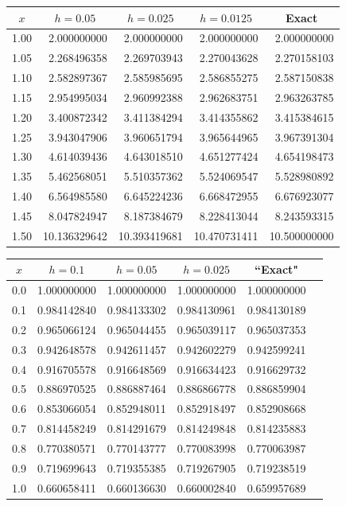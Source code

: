 \documentclass[dvips]{book}
\renewcommand{\exer}[1]{\par\medskip\;\noindent{\color{red}\bf #1.}}
\numberwithin{example}{section}
\numberwithin{equation}{section}
\numberwithin{theorem}{section}
\numberwithin{table}{section}
\numberwithin{figure}{section}
\begin{document}
\exer{3.2.26}
{\small
\begin{tabular}{|c|r|r|r|r|}\hline
\multicolumn{1}{|c|}{$x$}&
\multicolumn{1}{|c|}{$h=0.05$}&
\multicolumn{1}{|c|}{$h=0.025$}&
\multicolumn{1}{|c|}{$h=0.0125$}&
\multicolumn{1}{|c|}{Exact}\\ \hline
1.00 &  2.000000000 &  2.000000000 &  2.000000000 &  2.000000000 \\
1.05 &  2.268496358 &  2.269703943 &  2.270043628 &  2.270158103 \\
1.10 &  2.582897367 &  2.585985695 &  2.586855275 &  2.587150838 \\
1.15 &  2.954995034 &  2.960992388 &  2.962683751 &  2.963263785 \\
1.20 &  3.400872342 &  3.411384294 &  3.414355862 &  3.415384615 \\
1.25 &  3.943047906 &  3.960651794 &  3.965644965 &  3.967391304 \\
1.30 &  4.614039436 &  4.643018510 &  4.651277424 &  4.654198473 \\
1.35 &  5.462568051 &  5.510357362 &  5.524069547 &  5.528980892 \\
1.40 &  6.564985580 &  6.645224236 &  6.668472955 &  6.676923077 \\
1.45 &  8.047824947 &  8.187384679 &  8.228413044 &  8.243593315 \\
1.50 & 10.136329642 & 10.393419681 & 10.470731411 & 10.500000000 \\
\hline
\end{tabular}}



\exer{3.2.28}
{\small
\begin{tabular}{|c|r|r|r|r|r|}
\hline
\multicolumn{1}{|c|}{$x$}&
\multicolumn{1}{|c|}{$h=0.1$}&
\multicolumn{1}{|c|}{$h=0.05$}&
\multicolumn{1}{|c|}{$h=0.025$}&
\multicolumn{1}{|c|}{``Exact"}\\ \hline
0.0 & 1.000000000 & 1.000000000 & 1.000000000 & 1.000000000 \\
0.1 & 0.984142840 & 0.984133302 & 0.984130961 & 0.984130189 \\
0.2 & 0.965066124 & 0.965044455 & 0.965039117 & 0.965037353 \\
0.3 & 0.942648578 & 0.942611457 & 0.942602279 & 0.942599241 \\
0.4 & 0.916705578 & 0.916648569 & 0.916634423 & 0.916629732 \\
0.5 & 0.886970525 & 0.886887464 & 0.886866778 & 0.886859904 \\
0.6 & 0.853066054 & 0.852948011 & 0.852918497 & 0.852908668 \\
0.7 & 0.814458249 & 0.814291679 & 0.814249848 & 0.814235883 \\
0.8 & 0.770380571 & 0.770143777 & 0.770083998 & 0.770063987 \\
0.9 & 0.719699643 & 0.719355385 & 0.719267905 & 0.719238519 \\
1.0 & 0.660658411 & 0.660136630 & 0.660002840 & 0.659957689 \\
\hline
\end{tabular}}
\end{document}

